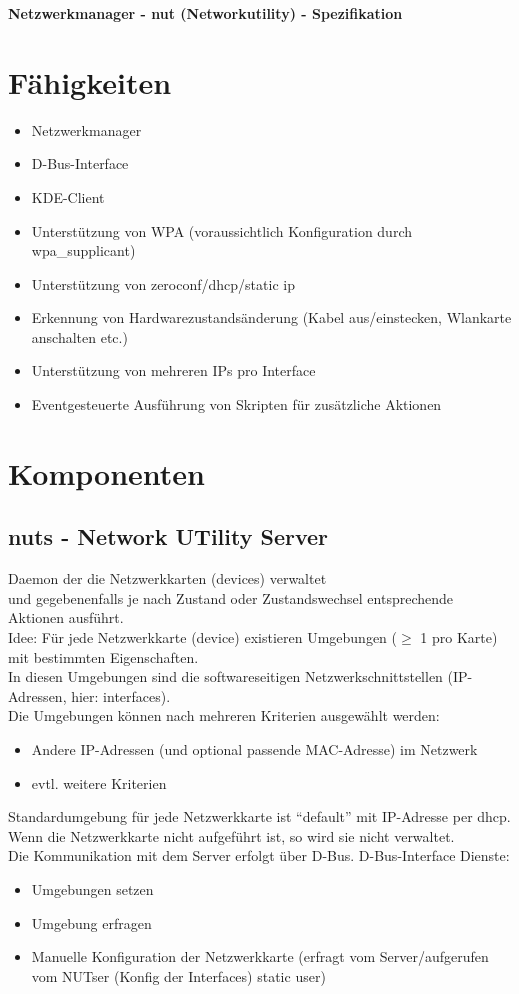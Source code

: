 \documentclass[a4paper,10pt]{scrartcl}
\begin{document}
\begin{Large}\textbf{Netzwerkmanager - nut (Networkutility) - Spezifikation}\end{Large}


\section*{Fähigkeiten}
\begin{itemize}
\item Netzwerkmanager
\item D-Bus-Interface
\item KDE-Client
\item Unterstützung von WPA (voraussichtlich Konfiguration durch wpa\_supplicant)
\item Unterstützung von zeroconf/dhcp/static ip
\item Erkennung von Hardwarezustandsänderung (Kabel aus/einstecken, Wlankarte anschalten etc.)
\item Unterstützung von mehreren IPs pro Interface
\item Eventgesteuerte Ausführung von Skripten für zusätzliche Aktionen
\end{itemize}


\section*{Komponenten}
\subsection*{nuts - Network UTility Server}
Daemon der die Netzwerkkarten (devices) verwaltet \\
und gegebenenfalls je nach Zustand oder Zustandswechsel entsprechende Aktionen ausführt. \\
Idee:
Für jede Netzwerkkarte (device) existieren Umgebungen ($\geq$ 1 pro Karte) mit bestimmten Eigenschaften. \\
In diesen Umgebungen sind die softwareseitigen Netzwerkschnittstellen (IP-Adressen, hier: interfaces).\\
Die Umgebungen können nach mehreren Kriterien ausgewählt werden:
\begin{itemize}
 \item Andere IP-Adressen (und optional passende MAC-Adresse) im Netzwerk
 \item evtl. weitere Kriterien
\end{itemize}
Standardumgebung für jede Netzwerkkarte ist ``default'' mit IP-Adresse per dhcp. \\
Wenn die Netzwerkkarte nicht aufgeführt ist, so wird sie nicht verwaltet.\\
Die Kommunikation mit dem Server erfolgt über D-Bus.
D-Bus-Interface Dienste:
\begin{itemize}
 \item Umgebungen setzen
 \item Umgebung erfragen
 \item Manuelle Konfiguration der Netzwerkkarte (erfragt vom Server/aufgerufen vom NUTser (Konfig der Interfaces) static user)
\end{itemize}
\end{document}
